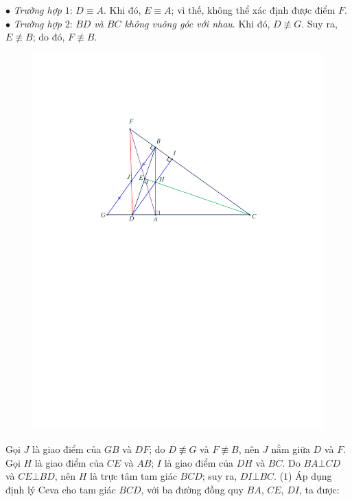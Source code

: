 \begin{multicols}{2}
	\vskip 0.05cm
	$\bullet$ \textit{Trường hợp} $1$: $D \equiv A$.
	\vskip 0.05cm
	Khi đó, $E \equiv A$; vì thế, không thể xác định được điểm $F$.
	\vskip 0.05cm
	$\bullet$ \textit{Trường hợp} $2$: $BD$ \textit{và $BC$ không vuông góc với nhau}.
	\vskip 0.05cm
	Khi đó, $D \not\equiv G$.  Suy ra, $E \not\equiv B$; do đó, $F \not\equiv B$.  
	\begin{figure}[H]
		\centering
		\vspace*{-5pt}
		\captionsetup{labelformat= empty, justification=centering}
		\includegraphics[width=0.9\linewidth]{P615H1}
		\vspace*{-15pt}
	\end{figure}
	Gọi $J$ là giao điểm của $GB$ và $DF$; do $D \not\equiv G$  và $F \not\equiv B$,  nên $J$ nằm giữa $D$ và $F$.
	\vskip 0.05cm
	Gọi $H$ là giao điểm của $CE$ và $AB$; $I$ là giao điểm của $DH$ và $BC$.
	\vskip 0.05cm
	Do $BA \bot CD$ và $CE \bot BD$, nên $H$ là trực tâm tam giác $BCD$; suy ra, $DI \bot BC$. \hfill                                   ($1$)
	\vskip 0.05cm
	Áp dụng định lý Ceva cho tam giác $BCD$, với ba đường đồng quy $BA$, $CE$, $DI$, ta được:
	\begin{align*}

\end{align*}
\end{multicols}
